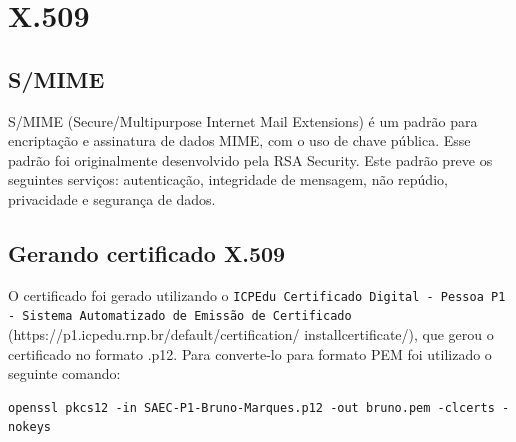 \documentclass[
    article,            %
    11pt,               %
    oneside,            %
    a4paper,            %
    english,            %
    brazil,             %
    sumario=tradicional,
    ]{abntex2}
\begin{document}
\section{\textbf{X.509}}

\subsection{\textbf{S/MIME}}

S/MIME (Secure/Multipurpose Internet Mail Extensions) é um padrão para encriptação e assinatura de dados MIME, com o uso de chave pública. Esse padrão foi originalmente desenvolvido pela RSA Security. Este padrão preve os seguintes serviços: autenticação, integridade de mensagem, não repúdio, privacidade e segurança de dados. \cite{smime-wiki}

\subsection{\textbf{Gerando certificado X.509}}

O certificado foi gerado utilizando o \texttt{ICPEdu Certificado Digital - Pessoa P1 - Sistema Automatizado de Emissão de Certificado} (https://p1.icpedu.rnp.br/default/certification/
installcertificate/), que gerou o certificado no formato .p12. Para converte-lo para formato PEM foi utilizado o seguinte comando:

\begin{Verbatim}[frame=single, commandchars=\\\{\}, fontsize=\footnotesize]
openssl pkcs12 -in SAEC-P1-Bruno-Marques.p12 -out bruno.pem -clcerts -nokeys
\end{Verbatim}
\end{document}
